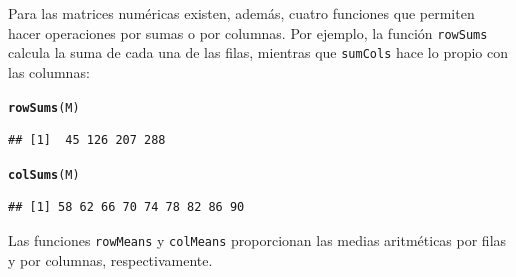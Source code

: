 \documentclass[10pt,a4paper]{article}\usepackage[]{graphicx}\usepackage[]{color}
\makeatletter
\newcommand{\hlstd}[1]{\textcolor[rgb]{0.345,0.345,0.345}{#1}}%
\newcommand{\hlkwd}[1]{\textcolor[rgb]{0.737,0.353,0.396}{\textbf{#1}}}%
\newenvironment{kframe}{%
 \def\at@end@of@kframe{}%
 \ifinner\ifhmode%
  \def\at@end@of@kframe{\end{minipage}}%
  \begin{minipage}{\columnwidth}%
 \fi\fi%
 \def\FrameCommand##1{\hskip\@totalleftmargin \hskip-\fboxsep
 \colorbox{shadecolor}{##1}\hskip-\fboxsep
     \hskip-\linewidth \hskip-\@totalleftmargin \hskip\columnwidth}%
 \MakeFramed {\advance\hsize-\width
   \@totalleftmargin\z@ \linewidth\hsize
   \@setminipage}}%
 {\par\unskip\endMakeFramed%
 \at@end@of@kframe}
\newenvironment{knitrout}{}{} %
\makeatother
\begin{document}
     Para las matrices numéricas existen, además, cuatro funciones que permiten hacer operaciones por sumas o por columnas. Por ejemplo, la función {\tt rowSums} calcula la suma de cada una de las filas, mientras que {\tt sumCols} hace lo propio con las columnas:
\begin{knitrout}
\color{fgcolor}\begin{kframe}
\begin{alltt}
\hlkwd{rowSums}\hlstd{(M)}
\end{alltt}
\begin{verbatim}
## [1]  45 126 207 288
\end{verbatim}
\begin{alltt}
\hlkwd{colSums}\hlstd{(M)}
\end{alltt}
\begin{verbatim}
## [1] 58 62 66 70 74 78 82 86 90
\end{verbatim}
\end{kframe}
\end{knitrout}
     Las funciones {\tt rowMeans} y {\tt colMeans} proporcionan las medias aritméticas por filas y por columnas, respectivamente.
\end{document}
